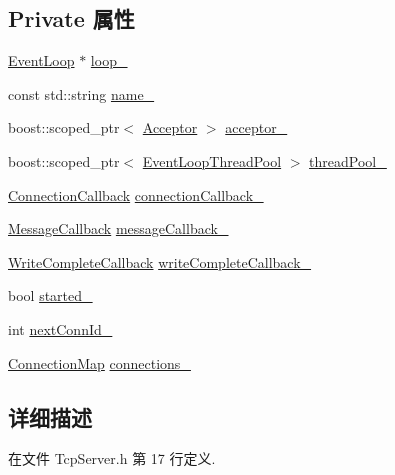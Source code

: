 \subsection*{Private 属性}
\begin{DoxyCompactItemize}
\item 
\hyperlink{classmuduo_1_1EventLoop}{Event\+Loop} $\ast$ \hyperlink{classmuduo_1_1TcpServer_a19968f50018d32ac31f5cba0195591ac}{loop\+\_\+}
\item 
const std\+::string \hyperlink{classmuduo_1_1TcpServer_a723d30392e2c4f36252de0528a1b246d}{name\+\_\+}
\item 
boost\+::scoped\+\_\+ptr$<$ \hyperlink{classmuduo_1_1Acceptor}{Acceptor} $>$ \hyperlink{classmuduo_1_1TcpServer_ae5dd43c1da06f8fcb95db8add7e93e49}{acceptor\+\_\+}
\item 
boost\+::scoped\+\_\+ptr$<$ \hyperlink{classmuduo_1_1EventLoopThreadPool}{Event\+Loop\+Thread\+Pool} $>$ \hyperlink{classmuduo_1_1TcpServer_a734d140bc9fcb5fe26e93dd0a42cf775}{thread\+Pool\+\_\+}
\item 
\hyperlink{namespacemuduo_ac7f7b0c9c9e96123dfea3fe120a2c404}{Connection\+Callback} \hyperlink{classmuduo_1_1TcpServer_ae4ac7fea1abbcfb56d481dbe8ffb37e7}{connection\+Callback\+\_\+}
\item 
\hyperlink{namespacemuduo_ab8a96fa483cffe150618e01058e6fc1b}{Message\+Callback} \hyperlink{classmuduo_1_1TcpServer_aa4d5ea21d215329779698e634e5e7755}{message\+Callback\+\_\+}
\item 
\hyperlink{namespacemuduo_a605eda27d048a69607942b95735d7087}{Write\+Complete\+Callback} \hyperlink{classmuduo_1_1TcpServer_a525f0d11cfa2e271600caa30407b6150}{write\+Complete\+Callback\+\_\+}
\item 
bool \hyperlink{classmuduo_1_1TcpServer_a5ad69cfc4163d7797bc0f0d7eadb95a7}{started\+\_\+}
\item 
int \hyperlink{classmuduo_1_1TcpServer_aab950be51cdd74cb0fc104fa135e4853}{next\+Conn\+Id\+\_\+}
\item 
\hyperlink{classmuduo_1_1TcpServer_a757ed86be3708eee03ff754c5108abdd}{Connection\+Map} \hyperlink{classmuduo_1_1TcpServer_a07322e7616e616baff3de1675028979a}{connections\+\_\+}
\end{DoxyCompactItemize}


\subsection{详细描述}


在文件 Tcp\+Server.\+h 第 17 行定义.




